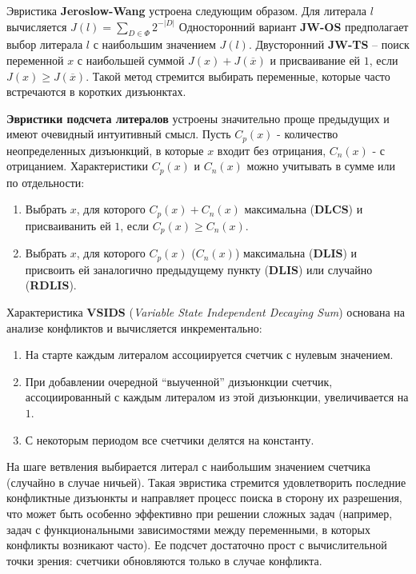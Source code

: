Эвристика \textbf{Jeroslow-Wang} устроена следующим образом. Для литерала $l$ вычисляется $J(l) = \sum_{D \in \Phi} 2^{-\left|D\right|}$
Односторонний вариант \textbf{JW-OS} предполагает выбор литерала $l$ с наибольшим значением $J(l)$. Двусторонний \textbf{JW-TS} -- поиск переменной $x$ с наибольшей суммой $J(x)+J(\overline{x})$ и присваивание ей $1$, если $J(x) \ge J(\overline{x})$. Такой метод стремится выбирать переменные, которые часто встречаются в коротких дизъюнктах.

\textbf{Эвристики подсчета литералов} устроены значительно проще предыдущих и имеют очевидный интуитивный смысл. Пусть $C_p(x)$ - количество неопределенных дизъюнкций, в которые $x$ входит без отрицания, $C_n(x)$ - с отрицанием. 
Характеристики $C_p(x)$ и $C_n(x)$ можно учитывать в сумме или по отдельности:

\begin{enumerate}
\item Выбрать $x$, для которого $C_p(x) + C_n(x)$ максимальна (\textbf{DLCS}) и присваиванить ей $1$, если $C_p(x) \ge C_n(x)$.
\item Выбрать $x$, для которого $C_p(x)$ ($C_n(x)$) максимальна (\textbf{DLIS}) и присвоить ей заналогично предыдущему пункту (\textbf{DLIS}) или случайно (\textbf{RDLIS}).
\end{enumerate}

Характеристика \textbf{VSIDS} (\textit{Variable State Independent Decaying Sum}) основана на анализе конфликтов и вычисляется инкрементально:

\begin{enumerate}
\item На старте каждым литералом ассоциируется счетчик с нулевым значением.
\item При добавлении очередной \enquote{выученной} дизъюнкции счетчик, ассоциированный с каждым литералом из этой дизъюнкции, увеличивается на $1$.
\item С некоторым периодом все счетчики делятся на константу.
\end{enumerate}

На шаге ветвления выбирается литерал с наибольшим значением счетчика (случайно в случае ничьей). Такая эвристика стремится удовлетворить последние конфликтные дизъюнкты и направляет процесс поиска в сторону их разрешения, что может быть особенно эффективно при решении сложных задач (например, задач с функциональными зависимостями между переменными, в которых конфликты возникают часто). Ее подсчет достаточно прост с вычислительной точки зрения: счетчики обновляются только в случае конфликта.

